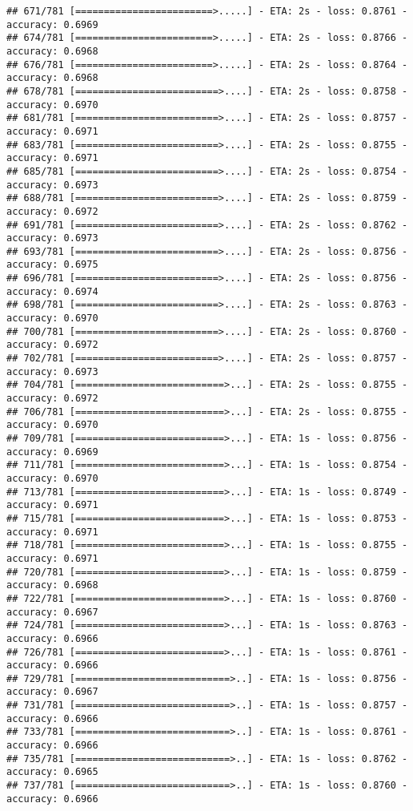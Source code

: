 \documentclass[
]{article}
\begin{document}
\begin{verbatim}
## 671/781 [========================>.....] - ETA: 2s - loss: 0.8761 - accuracy: 0.6969
## 674/781 [========================>.....] - ETA: 2s - loss: 0.8766 - accuracy: 0.6968
## 676/781 [========================>.....] - ETA: 2s - loss: 0.8764 - accuracy: 0.6968
## 678/781 [=========================>....] - ETA: 2s - loss: 0.8758 - accuracy: 0.6970
## 681/781 [=========================>....] - ETA: 2s - loss: 0.8757 - accuracy: 0.6971
## 683/781 [=========================>....] - ETA: 2s - loss: 0.8755 - accuracy: 0.6971
## 685/781 [=========================>....] - ETA: 2s - loss: 0.8754 - accuracy: 0.6973
## 688/781 [=========================>....] - ETA: 2s - loss: 0.8759 - accuracy: 0.6972
## 691/781 [=========================>....] - ETA: 2s - loss: 0.8762 - accuracy: 0.6973
## 693/781 [=========================>....] - ETA: 2s - loss: 0.8756 - accuracy: 0.6975
## 696/781 [=========================>....] - ETA: 2s - loss: 0.8756 - accuracy: 0.6974
## 698/781 [=========================>....] - ETA: 2s - loss: 0.8763 - accuracy: 0.6970
## 700/781 [=========================>....] - ETA: 2s - loss: 0.8760 - accuracy: 0.6972
## 702/781 [=========================>....] - ETA: 2s - loss: 0.8757 - accuracy: 0.6973
## 704/781 [==========================>...] - ETA: 2s - loss: 0.8755 - accuracy: 0.6972
## 706/781 [==========================>...] - ETA: 2s - loss: 0.8755 - accuracy: 0.6970
## 709/781 [==========================>...] - ETA: 1s - loss: 0.8756 - accuracy: 0.6969
## 711/781 [==========================>...] - ETA: 1s - loss: 0.8754 - accuracy: 0.6970
## 713/781 [==========================>...] - ETA: 1s - loss: 0.8749 - accuracy: 0.6971
## 715/781 [==========================>...] - ETA: 1s - loss: 0.8753 - accuracy: 0.6971
## 718/781 [==========================>...] - ETA: 1s - loss: 0.8755 - accuracy: 0.6971
## 720/781 [==========================>...] - ETA: 1s - loss: 0.8759 - accuracy: 0.6968
## 722/781 [==========================>...] - ETA: 1s - loss: 0.8760 - accuracy: 0.6967
## 724/781 [==========================>...] - ETA: 1s - loss: 0.8763 - accuracy: 0.6966
## 726/781 [==========================>...] - ETA: 1s - loss: 0.8761 - accuracy: 0.6966
## 729/781 [===========================>..] - ETA: 1s - loss: 0.8756 - accuracy: 0.6967
## 731/781 [===========================>..] - ETA: 1s - loss: 0.8757 - accuracy: 0.6966
## 733/781 [===========================>..] - ETA: 1s - loss: 0.8761 - accuracy: 0.6966
## 735/781 [===========================>..] - ETA: 1s - loss: 0.8762 - accuracy: 0.6965
## 737/781 [===========================>..] - ETA: 1s - loss: 0.8760 - accuracy: 0.6966

\end{verbatim}
\end{document}
